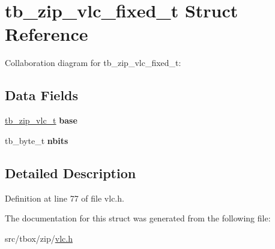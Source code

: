 \hypertarget{structtb__zip__vlc__fixed__t}{\section{tb\-\_\-zip\-\_\-vlc\-\_\-fixed\-\_\-t Struct Reference}
\label{structtb__zip__vlc__fixed__t}
}


Collaboration diagram for tb\-\_\-zip\-\_\-vlc\-\_\-fixed\-\_\-t\-:
\subsection*{Data Fields}
\begin{DoxyCompactItemize}
\item 
\hypertarget{structtb__zip__vlc__fixed__t_a3601d6d11140b8450c1553a72b03f8c6}{\hyperlink{structtb__zip__vlc__t}{tb\-\_\-zip\-\_\-vlc\-\_\-t} {\bfseries base}}\label{structtb__zip__vlc__fixed__t_a3601d6d11140b8450c1553a72b03f8c6}

\item 
\hypertarget{structtb__zip__vlc__fixed__t_a1df55eb0824c3215ba4e736ca97a5020}{tb\-\_\-byte\-\_\-t {\bfseries nbits}}\label{structtb__zip__vlc__fixed__t_a1df55eb0824c3215ba4e736ca97a5020}

\end{DoxyCompactItemize}


\subsection{Detailed Description}


Definition at line 77 of file vlc.\-h.



The documentation for this struct was generated from the following file\-:\begin{DoxyCompactItemize}
\item 
src/tbox/zip/\hyperlink{vlc_8h}{vlc.\-h}\end{DoxyCompactItemize}
